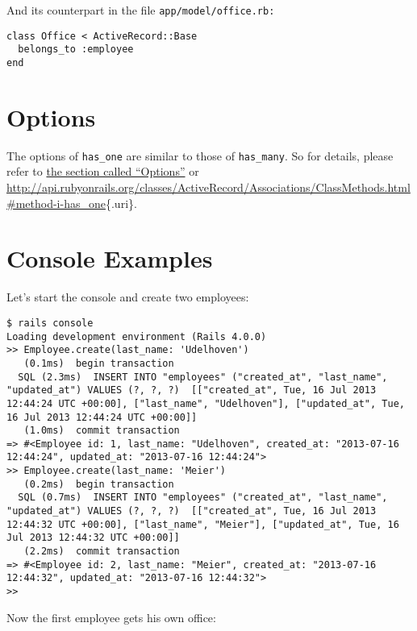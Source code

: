 \documentclass[a4paper]{book}
\begin{document}
And its counterpart in the file \texttt{app/model/office.rb:}

\begin{shaded}\begin{verbatim}
class Office < ActiveRecord::Base
  belongs_to :employee
end
\end{verbatim}\end{shaded}

\section{Options}\label{options-1}

The options of \texttt{has\_one} are similar to those of \texttt{has\_many}. So for details, please refer to \hyperref[activerecordux5f1nux5foptionen]{the section called “Options”} or \url{http://api.rubyonrails.org/classes/ActiveRecord/Associations/ClassMethods.html\#method-i-has_one}\{.uri\}.

\section{Console Examples}\label{console-examples}

Let's start the console and create two employees:

\begin{shaded}\begin{verbatim}
$ rails console
Loading development environment (Rails 4.0.0)
>> Employee.create(last_name: 'Udelhoven')
   (0.1ms)  begin transaction
  SQL (2.3ms)  INSERT INTO "employees" ("created_at", "last_name", "updated_at") VALUES (?, ?, ?)  [["created_at", Tue, 16 Jul 2013 12:44:24 UTC +00:00], ["last_name", "Udelhoven"], ["updated_at", Tue, 16 Jul 2013 12:44:24 UTC +00:00]]
   (1.0ms)  commit transaction
=> #<Employee id: 1, last_name: "Udelhoven", created_at: "2013-07-16 12:44:24", updated_at: "2013-07-16 12:44:24">
>> Employee.create(last_name: 'Meier')
   (0.2ms)  begin transaction
  SQL (0.7ms)  INSERT INTO "employees" ("created_at", "last_name", "updated_at") VALUES (?, ?, ?)  [["created_at", Tue, 16 Jul 2013 12:44:32 UTC +00:00], ["last_name", "Meier"], ["updated_at", Tue, 16 Jul 2013 12:44:32 UTC +00:00]]
   (2.2ms)  commit transaction
=> #<Employee id: 2, last_name: "Meier", created_at: "2013-07-16 12:44:32", updated_at: "2013-07-16 12:44:32">
>>
\end{verbatim}\end{shaded}

Now the first employee gets his own office:
\end{document}
